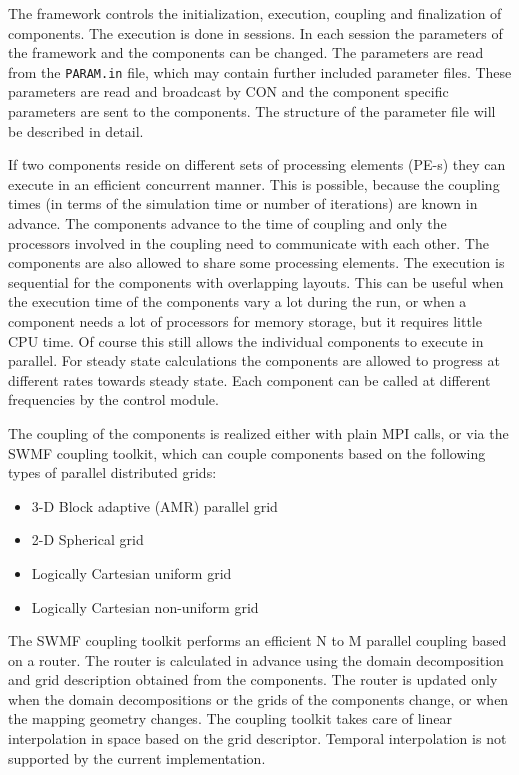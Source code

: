 The framework controls the initialization, execution, coupling and
finalization of components.  The execution is done in sessions. In
each session the parameters of the framework and the components can be
changed.  The parameters are read from the {\tt PARAM.in} file, which
may contain further included parameter files.  These parameters are
read and broadcast by CON and the component specific parameters are
sent to the components. The structure of the parameter file will be
described in detail.

If two components reside on different sets of processing elements
(PE-s) they can execute in an efficient concurrent manner.
This is possible, because the coupling times (in terms of the simulation time
or number of iterations) are known in advance.  
The components advance to the time of coupling and
only the processors involved in the coupling need to communicate with
each other. The components are also allowed to share some processing elements.
The execution is sequential for the components with overlapping layouts.
This can be useful when the execution time of the components vary a lot
during the run, or when a component needs a lot of processors 
for memory storage, but it requires little CPU time.
Of course this still allows the individual components to execute in parallel.
For steady state calculations the components are allowed to progress
at different rates towards steady state. Each component can be called
at different frequencies by the control module.

The coupling of the components is realized either with plain MPI
calls, or via the SWMF coupling toolkit, which can couple components
based on the following types of parallel distributed grids:
\begin{itemize}
\item 3-D Block adaptive (AMR) parallel grid
\item 2-D Spherical grid
\item Logically Cartesian uniform grid
\item Logically Cartesian non-uniform grid 
\end{itemize}
The SWMF coupling toolkit performs an efficient N to M parallel
coupling based on a router. The router is calculated in advance using
the domain decomposition and grid description obtained from the
components.  The router is updated only when the domain decompositions
or the grids of the components change, or when the mapping geometry
changes.  The coupling toolkit takes care of linear interpolation in
space based on the grid descriptor.  Temporal interpolation is not
supported by the current implementation.

